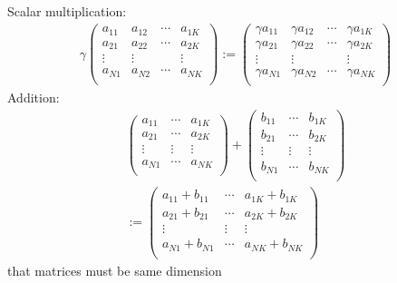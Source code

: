 \documentclass[letterpaper,10pt,english]{jupyterBook}
\begin{document}
\sphinxAtStartPar
Scalar multiplication:
\begin{equation*}
\begin{split}
%
\gamma 
\left(
\begin{array}{cccc}
a_{11} & a_{12} & \cdots & a_{1K} \\
a_{21} & a_{22} & \cdots & a_{2K} \\
\vdots & \vdots & & \vdots \\
a_{N1} & a_{N2} & \cdots & a_{NK} \\
\end{array}
\right)
:=
\left(
\begin{array}{cccc}
\gamma a_{11} & \gamma a_{12} & \cdots & \gamma a_{1K} \\
\gamma a_{21} & \gamma a_{22} & \cdots & \gamma a_{2K} \\
\vdots & \vdots & & \vdots \\
\gamma a_{N1} & \gamma a_{N2} & \cdots & \gamma a_{NK} \\
\end{array}
\right)
%
\end{split}
\end{equation*}
\sphinxAtStartPar
Addition:
\begin{equation*}
\begin{split}
%
\left(
\begin{array}{ccc}
a_{11} & \cdots & a_{1K} \\
a_{21} & \cdots & a_{2K} \\
\vdots & \vdots & \vdots \\
a_{N1} & \cdots & a_{NK} \\
\end{array}
\right)
+
\left(
\begin{array}{ccc}
b_{11} & \cdots & b_{1K} \\
b_{21} & \cdots & b_{2K} \\
\vdots & \vdots & \vdots \\
b_{N1} & \cdots & b_{NK} \\
\end{array}
\right)
\\
:=
\left(
\begin{array}{ccc}
a_{11} + b_{11} & \cdots & a_{1K} + b_{1K} \\
a_{21} + b_{21} & \cdots & a_{2K} + b_{2K} \\
\vdots & \vdots & \vdots \\
a_{N1} + b_{N1} & \cdots & a_{NK} + b_{NK} \\
\end{array}
\right)
%
\end{split}
\end{equation*}
\sphinxAtStartPar
{} that matrices must be same dimension
\end{document}
